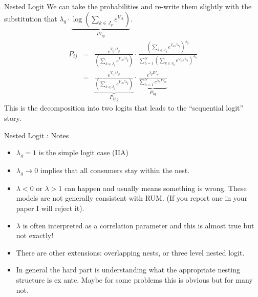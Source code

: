 \documentclass[xcolor=pdftex,dvipsnames,table,mathserif]{beamer}
\begin{document}
\begin{frame}{Nested Logit}
We can take the probabilities and re-write them slightly with the substitution that 
$\lambda_g \cdot \underbrace{\log \left(\sum_{k \in J_g} e^{V_{ik}} \right)}_{IV_{ig}}$.
\begin{eqnarray*}
P_{ij} &=& \frac{ e^{V_{ij}/\lambda_g}}{ \left(\sum_{k \in J_g} e^{V_{ik}/\lambda_g} \right)}
\cdot
\frac{ \left(\sum_{k \in J_g} e^{V_{ik}/\lambda_g} \right)^{\lambda_g}}{\sum_{h=1}^G \left(\sum_{k \in J_h} e^{V_{ik}/\lambda_h} \right)^{\lambda_h}} \\
&=& \underbrace{\frac{ e^{V_{ij}/\lambda_g}}{ \left(\sum_{k \in J_g} e^{V_{ik}/\lambda_g} \right)}}_{P_{i j | g}}
\cdot
\underbrace{\frac{e^{\lambda_g IV_{ig}}}{\sum_{h=1}^{G} e^{\lambda_h IV_{ih}} }}_{P_{ig}}
\end{eqnarray*}
This is the decomposition into two logits that leads to the ``sequential logit'' story.
\end{frame}

\begin{frame}{Nested Logit : Notes}
\begin{itemize}
\item $\lambda_g=1$ is the simple logit case (IIA)
\item $\lambda_g \rightarrow 0$ implies that all consumers stay within the nest.
\item $\lambda < 0$ or $\lambda > 1$ can happen and usually means something is wrong. These models are not generally consistent with RUM. (If you report one in your paper I will reject it).
\item $\lambda$ is often interpreted as a correlation parameter and this is almost true but not exactly!
\item There are other extensions: overlapping nests, or three level nested logit. 
\item In general the hard part is understanding what the appropriate nesting structure is ex ante. Maybe for some problems this is obvious but for many not.
\end{itemize}
\end{frame}

\end{document}
